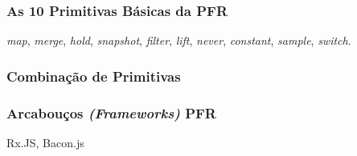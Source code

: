 


\subsubsection{As 10 Primitivas Básicas da PFR}
\label{sec:pfr-10-primitivas}

\emph{map}, \emph{merge}, \emph{hold}, \emph{snapshot}, \emph{filter},
\emph{lift}, \emph{never}, \emph{constant}, \emph{sample}, \emph{switch}.

\subsubsection{Combinação de Primitivas}
\label{sec:pfr-combinacao}

\subsubsection{Arcabouços \emph{(Frameworks)} PFR}
\label{sec:pfr-frameworks}

Rx.JS, Bacon.js

